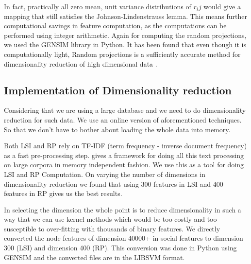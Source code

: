 In fact, practically all zero mean, unit variance distributions of 
$r_ij$ would give a mapping that still satisfies the Johnson-Lindenstrauss
lemma. This means further computational savings in feature 
computation, as the computations can be performed using integer 
arithmetic. Again for computing the random projections, we used the 
GENSIM library \citep{gensim} in Python.  
It has been found that even though it is computationally light, 
Random projections is a sufficiently accurate method for 
dimensionality reduction of high dimensional data \citet*{Dasgupta}.

\subsection{Implementation of Dimensionality reduction}

Considering that we are using a large database and we need to do 
dimensionality reduction for such data. We use an online version 
of aforementioned techniques. So that we don't have to bother about 
loading the whole data into memory. 

Both LSI and RP rely on TF-IDF (term frequency - inverse document 
frequency) as a fast pre-processing step.  
\citet*{radimrehurek} gives a framework \citet*{gensim} for doing all 
this text processing on large corpora in memory independent fashion. 
We use this as a tool for doing LSI and RP Computation. On varying the 
number of dimensions in dimensionality reduction we found that 
using 300 features in LSI and 400 features in RP gives us the best 
results.

In selecting the dimension the whole point is to reduce 
dimensionality in such a way that we can use kernel methods which would 
be too costly and too susceptible to over-fitting with thousands of 
binary features.
We directly converted the node features of dimension 40000+ in social 
features to dimension 300 (LSI) and dimension 400 (RP).  This 
conversion was done in Python using GENSIM and the converted 
files are in the LIBSVM format. 


